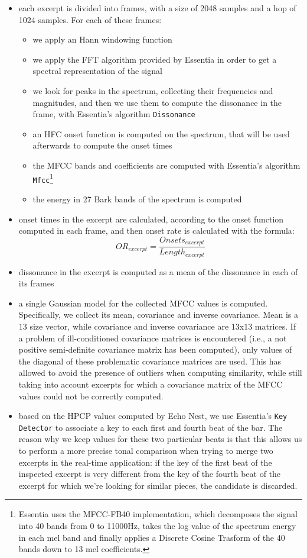 \begin{itemize}
\item each excerpt is divided into frames, with a size of 2048 samples and a hop of 1024 samples. For each of these frames:
\begin{itemize}
\item we apply an Hann windowing function
\item we apply the FFT algorithm provided by Essentia in order to get a spectral representation of the signal
\item we look for peaks in the spectrum, collecting their frequencies and magnitudes, and then we use them to compute the dissonance in the frame, with Essentia's algorithm \texttt{Dissonance}
\item an HFC onset function is computed on the spectrum, that will be used afterwards to compute the onset times
\item the MFCC bands and coefficients are computed with Essentia's algorithm \texttt{Mfcc}\footnote{Essentia uses the MFCC-FB40 implementation, which decomposes the signal into 40 bands from 0 to 11000Hz, takes the log value of the spectrum energy in each mel band and finally applies a Discrete Cosine Trasform of the 40 bands down to 13 mel coefficients.} 
\item the energy in 27 Bark bands of the spectrum is computed 
\end{itemize}
\item onset times in the excerpt are calculated, according to the onset function computed in each frame, and then onset rate is calculated with the formula:
\begin{equation}
OR_{excerpt} = \frac{Onsets_{excerpt}}{Length_{excerpt}}
\end{equation}
\item dissonance in the excerpt is computed as a mean of the dissonance in each of its frames
\item a single Gaussian model for the collected MFCC values is computed. Specifically, we collect its mean, covariance and inverse covariance. Mean is a $13$ size vector, while covariance and inverse covariance are $13$x$13$ matrices. If a problem of ill-conditioned covariance matrices is encountered (i.e., a not positive semi-definite covariance matrix has been computed), only values of the diagonal of these problematic covariance matrices are used. This has allowed to avoid the presence of outliers when computing similarity, while still taking into account excerpts for which a covariance matrix of the MFCC values could not be correctly computed. 
\item based on the HPCP values computed by Echo Nest, we use Essentia's \texttt{Key Detector} to associate a key to each first and fourth beat of the bar. The reason why we keep values for these two particular beats is that this allows us to perform a more precise tonal comparison when trying to merge two excerpts in the real-time application: if the key of the first beat of the inspected excerpt is very different from the key of the fourth beat of the excerpt for which we're looking for similar pieces, the candidate is discarded.
\end{itemize} 
